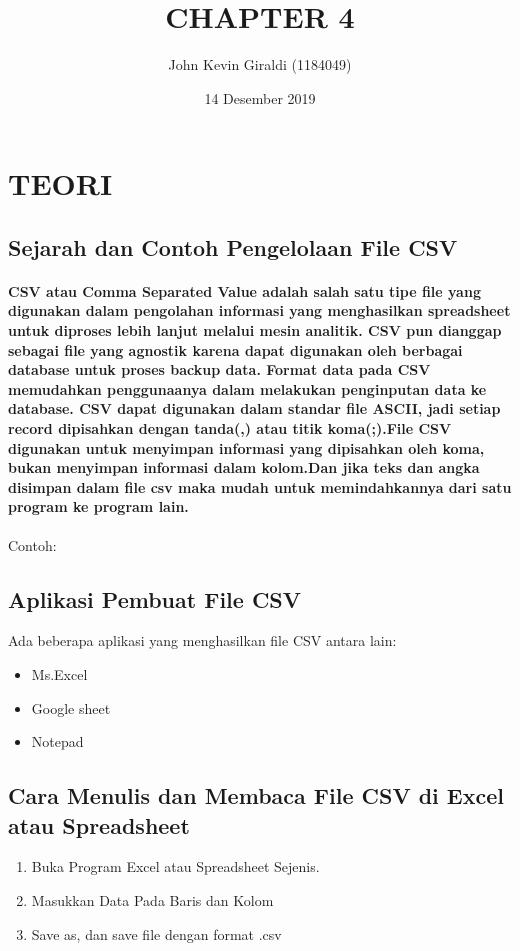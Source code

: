 \documentclass[a4paper, 12pt]{article}
\title{CHAPTER 4}
\author{John Kevin Giraldi (1184049)}
\date{14 Desember 2019}
\begin{document}
\maketitle

\section{TEORI}
\subsection{ Sejarah dan Contoh Pengelolaan File CSV}
\paragraph{CSV atau Comma Separated Value adalah salah satu tipe file yang digunakan dalam pengolahan informasi yang menghasilkan spreadsheet untuk diproses lebih lanjut melalui mesin analitik. CSV pun dianggap sebagai file yang agnostik karena dapat digunakan oleh berbagai database untuk proses backup data. Format data pada CSV memudahkan penggunaanya dalam melakukan penginputan data ke database. CSV dapat digunakan dalam standar ﬁle ASCII, jadi setiap record dipisahkan dengan tanda(,) atau titik koma(;).File CSV digunakan untuk menyimpan informasi yang dipisahkan oleh koma, bukan menyimpan informasi dalam kolom.Dan jika teks dan angka disimpan dalam ﬁle csv maka mudah untuk memindahkannya dari satu program ke program lain.}
Contoh: \\

\subsection{Aplikasi Pembuat File CSV}
Ada beberapa aplikasi yang menghasilkan file CSV antara lain:
\begin{itemize}
    \item Ms.Excel
    \item Google sheet
    \item Notepad
\end{itemize}

\subsection{Cara Menulis dan Membaca File CSV di Excel atau Spreadsheet}
\begin{enumerate}
    \item Buka Program Excel atau Spreadsheet Sejenis.
    \item Masukkan Data Pada Baris dan Kolom
    \item Save as, dan save ﬁle dengan format .csv
\end{enumerate}
\end{document}
